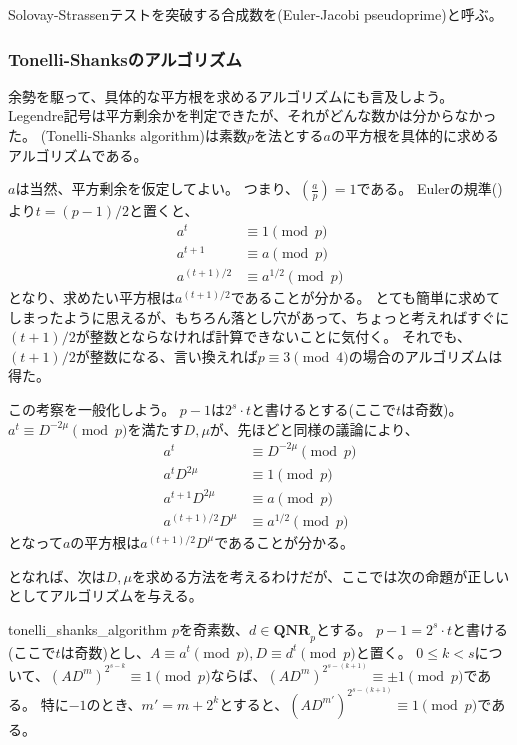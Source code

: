 
Solovay-Strassenテストを突破する合成数を(Euler-Jacobi pseudoprime)と呼ぶ。

\subsubsection{Tonelli-Shanksのアルゴリズム}
余勢を駆って、具体的な平方根を求めるアルゴリズムにも言及しよう。
Legendre記号は平方剰余かを判定できたが、それがどんな数かは分からなかった。
(Tonelli-Shanks algorithm)は素数$p$を法とする$a$の平方根を具体的に求めるアルゴリズムである。

$a$は当然、平方剰余を仮定してよい。
つまり、$\left(\frac{a}{p}\right)=1$である。
Eulerの規準()より$t=(p-1)/2$と置くと、
\begin{align*}
a^t &\equiv 1 \pmod{p}\\
a^{t+1} &\equiv a \pmod{p}\\
a^{(t+1)/2} &\equiv a^{1/2} \pmod{p}
\end{align*}
となり、求めたい平方根は$a^{(t+1)/2}$であることが分かる。
とても簡単に求めてしまったように思えるが、もちろん落とし穴があって、ちょっと考えればすぐに$(t+1)/2$が整数とならなければ計算できないことに気付く。
それでも、$(t+1)/2$が整数になる、言い換えれば$p\equiv3\pmod{4}$の場合のアルゴリズムは得た。

この考察を一般化しよう。
$p-1$は$2^s\cdot t$と書けるとする(ここで$t$は奇数)。
$a^t \equiv D^{-2\mu}\pmod{p}$を満たす$D,\mu$が、先ほどと同様の議論により、
\begin{align*}
a^t &\equiv D^{-2\mu}\pmod{p}\\
a^tD^{2\mu} &\equiv 1 \pmod{p}\\
a^{t+1}D^{2\mu} &\equiv a \pmod{p}\\
a^{(t+1)/2}D^{\mu} &\equiv a^{1/2} \pmod{p}
\end{align*}
となって$a$の平方根は$a^{(t+1)/2}D^{\mu}$であることが分かる。

となれば、次は$D,\mu$を求める方法を考えるわけだが、ここでは次の命題が正しいとしてアルゴリズムを与える。

\begin{Prop}{}{tonelli_shanks_algorithm}
$p$を奇素数、$d\in\mathbf{QNR}_p$とする。
$p-1=2^s\cdot t$と書ける(ここで$t$は奇数)とし、$A\equiv a^t\pmod{p},D\equiv d^t\pmod{p}$と置く。
$0\le k<s$について、$(AD^m)^{2^{s-k}}\equiv1\pmod{p}$ならば、$(AD^m)^{2^{s-(k+1)}}\equiv\pm1\pmod{p}$である。
特に$-1$のとき、$m'=m+2^k$とすると、$(AD^{m'})^{2^{s-(k+1)}}\equiv1\pmod{p}$である。
\end{Prop}

